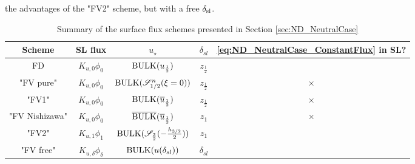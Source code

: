 the advantages of the "FV2" scheme, but with a free $\delta_{\rm sl}$.
%
\begin{table}
	\centering
\begin{tabular}{c|c|c|c|c}
	Scheme & SL flux & $u_\star$ & $\delta_{sl}$ 
		& \eqref{eq:ND_NeutralCase_ConstantFlux} in SL? \\
		\hline
		FD & $K_{u,0} \phi_0$ & ${\rm BULK}(u_{\frac{1}{2}})$
			& $z_{\frac{1}{2}}$ & \checkmark \\
		"FV pure" & $K_{u,0} \phi_0$ &
			${\rm BULK}({\cal S}_{1/2}^{n}(\xi=0))$
			& $z_{\frac{1}{2}}$ & $\times$ \\
		"FV1" & $K_{u,0} \phi_0$ &
			${\rm BULK}(\overline{u}_{\frac{1}{2}})$
			& $z_{\frac{1}{2}}$ & $\times$ \\
		"FV Nishizawa" & $K_{u,0} \phi_0$ &
			$\overline{\rm BULK}
				(\overline{u}_{\frac{1}{2}})$
			& $z_1$ & $\times$ \\
		"FV2" & $K_{u,1} \phi_1$ &
			${\rm BULK} ({\cal S}_{\frac{3}{2}}(
				  -\frac{h_{3/2}}{2}))$
			& $z_1$ & \checkmark \\
		"FV free" & $K_{u,\delta} \phi_{\delta}$ &
			${\rm BULK}
				(u(\delta_{sl}))$
			& $\delta_{sl}$ & \checkmark \\
	\end{tabular}
	\caption{Summary of the surface flux schemes presented in
	Section \ref{sec:ND_NeutralCase}}
	\label{tab:ND_NeutralCase_summary_sfscheme}
\end{table}
